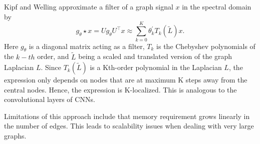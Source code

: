 \documentclass{article}
\begin{document}
\section{}
\section{}
\section{}
\subsection{}
\cite{kipf_semi-supervised_2017} 

Kipf and Welling approximate a filter of a graph signal $x$ in the spectral domain by 
$$
g_\theta \star x=U g_\theta U^{\top} x \approx \sum_{k=0}^K \theta_k^{\prime} T_k(\tilde{L}) x.
$$
Here $g_\theta$ is a diagonal matrix acting as a filter, $T_k$ is the Chebyshev polynomials of the $k-th$ order, and $\tilde{L}$ being a scaled and translated version of the graph Laplacian $L$. Since $T_k(\tilde{L})$ is a Kth-order polynomial in the Laplacian $L$, the expression only depends on nodes that are at maximum K steps away from the central nodes. Hence, the expression is K-localized. This is analogous to the convolutional layers of CNNs.    

Limitations of this approach include that memory requirement grows linearly in the number of edges. This leads to scalability issues when dealing with very large graphs.
\end{document}
